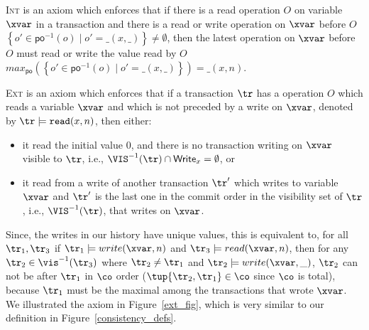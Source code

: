 \textsc{Int} is an axiom which enforces that if there is a read operation $O$ on variable $\xvar$ in a transaction and there is a read or write operation on $\xvar$ before $O$ \ie $\left\{o' \in \textsf{po}^{-1}(o) \mid o' = \_(x, \_) \right\} \neq \emptyset$, then the latest operation on $\xvar$ before $O$ must read or write the value read by $O$ \ie $max_{\textsf{po}} \left(\left\{o' \in \textsf{po}^{-1}(o) \mid o' = \_(x, \_) \right\}\right) = \_(x, n)$.

\textsc{Ext} is an axiom which enforces that if a transaction $\tr$ has a operation $O$ which reads a variable $\xvar$ and which is not preceded by a write on $\xvar$, denoted by $\tr \models \texttt{read}(x, n)$, then either:
\begin{itemize}
	\item it read the initial value 0, and there is no transaction writing on $\xvar$ visible to $\tr$, i.e., $\VIS^{-1}(\tr) \cap \textsf{Write}_x=\emptyset$, or
	\item it read from a write of another transaction $\tr'$ which writes to variable $\xvar$ and $\tr'$ is the last one in the commit order in the visibility set of $\tr$, i.e., $\VIS^{-1}(\tr)$, that writes on $\xvar$. 
\end{itemize}
	Since, the writes in our history have unique values, this is equivalent to, for all $\tr_1, \tr_3$ if $\tr_1 \models write(\xvar, n)$ and $\tr_3 \models read(\xvar, n)$, then for any $\tr_2 \in \vis^{-1}(\tr_3)$ where $\tr_2 \neq \tr_1$ and $\tr_2 \models write(\xvar, \_)$, $\tr_2$ can not be after $\tr_1$ in $\co$ order (\ie $\tup{\tr_2, \tr_1} \in \co$ since $\co$ is total), because $\tr_1$ must be the maximal among the transactions that wrote $\xvar$. We illustrated the axiom in Figure~\ref{ext_fig}, which is very similar to our definition in Figure~\ref{consistency_defs}.

